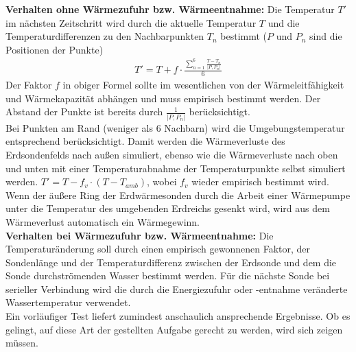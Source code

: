 \documentclass[12pt,a4paper]{article}
\begin{document}
 \textbf{Verhalten ohne Wärmezufuhr bzw. Wärmeentnahme:} Die Temperatur $T'$ im nächsten Zeitschritt wird durch die aktuelle Temperatur $T$ und die Temperaturdifferenzen zu den Nachbarpunkten $T_n$ bestimmt ($P$ und $P_n$ sind die Positionen der Punkte)
 \begin{align}
    T' = T + f\cdot \frac{\sum_{n=1}^{6} \frac{T-T_n}{|P,P_n|} }{6} 
 \end{align}
Der Faktor $f$ in obiger Formel sollte im wesentlichen von der Wärmeleitfähigkeit und Wärmekapazität abhängen und muss empirisch bestimmt werden. Der Abstand der Punkte ist bereits durch $\frac{1}{|P,P_n|}$ berücksichtigt.\\
Bei Punkten am Rand (weniger als 6 Nachbarn) wird die Umgebungstemperatur entsprechend berücksichtigt. Damit werden die Wärmeverluste des Erdsondenfelds nach außen simuliert, ebenso wie die Wärmeverluste nach oben und unten mit einer Temperaturabnahme der Temperaturpunkte selbst simuliert werden. $T'=T-f_v\cdot (T-T_{amb})$, wobei $f_v$ wieder empirisch bestimmt wird. Wenn der äußere Ring der Erdwärmesonden durch die Arbeit einer Wärmepumpe unter die Temperatur des umgebenden Erdreichs gesenkt wird, wird aus dem Wärmeverlust automatisch ein Wärmegewinn.\\
\textbf{Verhalten bei Wärmezufuhr bzw. Wärmeentnahme:} Die Temperaturänderung soll durch einen empirisch gewonnenen Faktor, der Sondenlänge und der Temperaturdifferenz zwischen der Erdsonde und dem die Sonde durchströmenden Wasser bestimmt werden. Für die nächste Sonde bei serieller Verbindung wird die durch die Energiezufuhr oder -entnahme veränderte Wassertemperatur verwendet.\\
Ein vorläufiger Test liefert zumindest anschaulich ansprechende Ergebnisse. Ob es gelingt, auf diese Art der gestellten Aufgabe gerecht zu werden, wird sich zeigen müssen.
\end{document}
